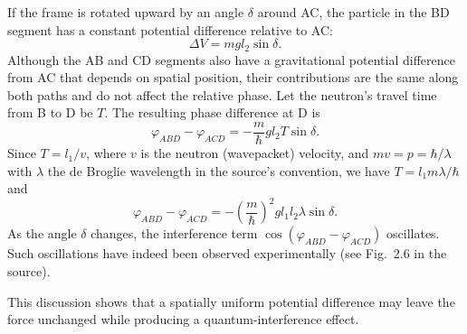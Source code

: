 \begin{center}\end{center}
If the frame is rotated upward by an angle $\delta$ around AC, the particle in the BD segment has a constant potential difference relative to AC:
\begin{equation}
\Delta V=mgl_2\sin\delta.
\end{equation}
Although the AB and CD segments also have a gravitational potential difference from AC that depends on spatial position, their contributions are the same along both paths and do not affect the relative phase. Let the neutron's travel time from B to D be $T$. The resulting phase difference at D is
\begin{equation}
\varphi_{ABD}-\varphi_{ACD}=-\frac{m}{\hbar}gl_2T\sin\delta.
\end{equation}
Since $T=l_1/v$, where $v$ is the neutron (wavepacket) velocity, and $mv=p=\hbar/\lambda$ with $\lambda$ the de Broglie wavelength in the source's convention, we have $T=l_1m\lambda/\hbar$ and
\begin{equation}
\boxed{\varphi_{ABD}-\varphi_{ACD}
=-\left(\frac{m}{\hbar}\right)^2gl_1l_2\lambda\sin\delta.}
\end{equation}
As the angle $\delta$ changes, the interference term $\cos(\varphi_{ABD}-\varphi_{ACD})$ oscillates. Such oscillations have indeed been observed experimentally (see Fig.~2.6 in the source).

This discussion shows that a spatially uniform potential difference may leave the force unchanged while producing a quantum-interference effect.

